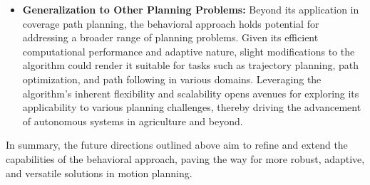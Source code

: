\begin{itemize}
    \item \textbf{Generalization to Other Planning Problems: } Beyond its application in coverage path planning, the behavioral approach holds potential for addressing a broader range of planning problems. Given its efficient computational performance and adaptive nature, slight modifications to the algorithm could render it suitable for tasks such as trajectory planning, path optimization, and path following in various domains. Leveraging the algorithm's inherent flexibility and scalability opens avenues for exploring its applicability to various planning challenges, thereby driving the advancement of autonomous systems in agriculture and beyond.
\end{itemize}

\vspace*{6mm}

In summary, the future directions outlined above aim to refine and extend the capabilities of the behavioral approach, paving the way for more robust, adaptive, and versatile solutions in motion planning.